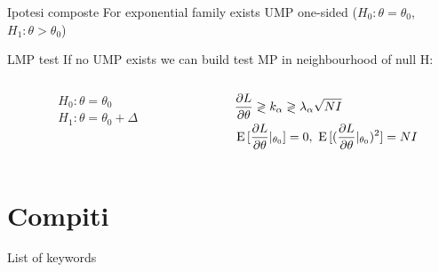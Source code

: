 \begin{frame}{Ipotesi composte}
For exponential family exists UMP one-sided ($H_0: \theta=\theta_0$, $H_1: \theta>\theta_0$)
\end{frame}

\begin{frame}{LMP test}
If no UMP exists we can build test MP in neighbourhood of null H:
\begin{columns}[T]
	\begin{column}{0.4\textwidth}
		\begin{align*}
		&H_0: \theta=\theta_0\\
		&H_1: \theta=\theta_0+\Delta
		\end{align*}
	\end{column}
	\begin{column}{0.6\textwidth}
		\begin{align*}
		&\PDy{\theta}{L}\gtrless k_{\alpha}\gtrless\lambda_{\alpha}\sqrt{NI}\\
		&\E{[\PDy{\theta}{L}|_{\theta_0}]}=0,\ \E{[(\PDy{\theta}{L}|_{\theta_0})^2]}=NI
		\end{align*}
	\end{column}
\end{columns}
\end{frame}


\section{Compiti}

\begin{wordonframe}{List of keywords}
\end{wordonframe}


